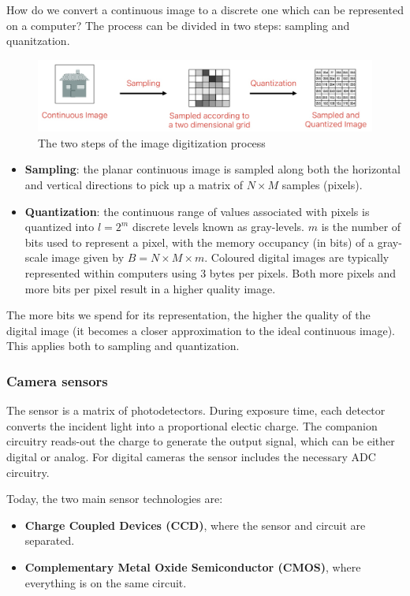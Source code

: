 \documentclass{article}
\begin{document}
How do we convert a continuous image to a discrete one which can be represented on a computer? 
The process can be divided in two steps: sampling and quanitzation.

\begin{figure}[htbp]
  \centering
  \includegraphics[width=0.55\linewidth]{./img/image_digitization.jpg}
  \caption{The two steps of the image digitization process}
  \label{fig:image_digitization}
\end{figure}

\begin{itemize}
  \item \textbf{Sampling}: the planar continuous image is sampled along both the horizontal and vertical directions to pick up a matrix of $N\times M$ samples (pixels).
  \item \textbf{Quantization}: the continuous range of values associated with pixels is quantized into $l=2^m$ discrete levels known as gray-levels.
  $m$ is the number of bits used to represent a pixel, with the memory occupancy (in bits) of a gray-scale image given by $B = N \times M \times m$. Coloured digital images are typically represented within computers using 3 bytes per pixels. Both more pixels and more bits per pixel result in a higher quality image.
\end{itemize}

The more bits we spend for its representation, the higher the quality of the digital image (it becomes a closer approximation to the ideal continuous image).
This applies both to sampling and quantization.

\subsubsection{Camera sensors}

The sensor is a matrix of photodetectors.
During exposure time, each detector converts the incident light into a proportional electic charge.
The companion circuitry reads-out the charge to generate the output signal, which can be either digital or analog.
For digital cameras the sensor includes the necessary ADC circuitry.

Today, the two main sensor technologies are:
\begin{itemize}
  \item \textbf{Charge Coupled Devices (CCD)}, where the sensor and circuit are separated.
  \item \textbf{ Complementary Metal Oxide Semiconductor (CMOS)}, where everything is on the same circuit.
\end{itemize}
\end{document}
